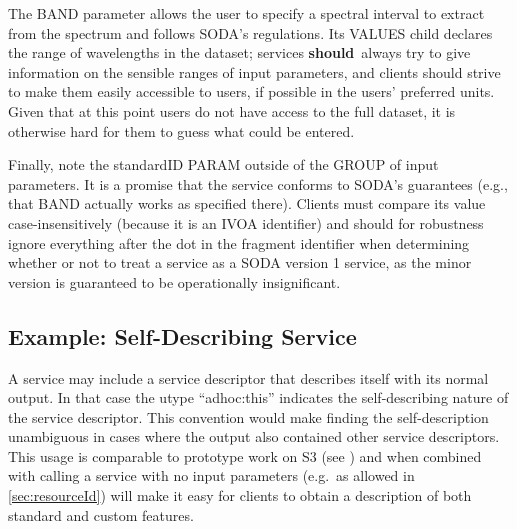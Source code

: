 \documentclass[11pt,a4paper]{ivoa}
\newcommand{\rfcshould}{\textbf{should}}
\begin{document}
The BAND parameter allows the user to specify a spectral interval to
extract from the spectrum and follows SODA's regulations.  Its VALUES
child declares the range of wavelengths in the dataset; services \rfcshould\
always try to give information on the sensible ranges of input
parameters, and clients should strive to make them easily accessible to
users, if possible in the users' preferred units.  Given that at this
point users do not have access to the full dataset, it is otherwise hard
for them to guess what could be entered.

Finally, note the standardID PARAM outside of the GROUP of input
parameters.  It is a promise that the service conforms to SODA's
guarantees (e.g., that BAND actually works as specified there).  Clients
must compare its value case-insensitively (because it is an IVOA
identifier) and should for robustness ignore everything after the dot in
the fragment identifier when determining whether or not to treat a
service as a SODA version 1 service, as the minor version is guaranteed
to be operationally insignificant.


\subsection{Example: Self-Describing Service}
\label{sec:selfDescribing}

A service may include a service descriptor that describes itself with
its normal output. In that case the utype ``adhoc:this'' indicates the
self-describing
nature of the service descriptor. This convention would make finding
the self-description
unambiguous in cases where the output also contained other service
descriptors.
   This usage is comparable to prototype work on S3
(see \citet{note:s3})
and when combined with calling a service with no input parameters
(e.g.\ as allowed in \ref{sec:resourceId})
will make it easy for clients to obtain a
description of both standard and custom features.
\end{document}
